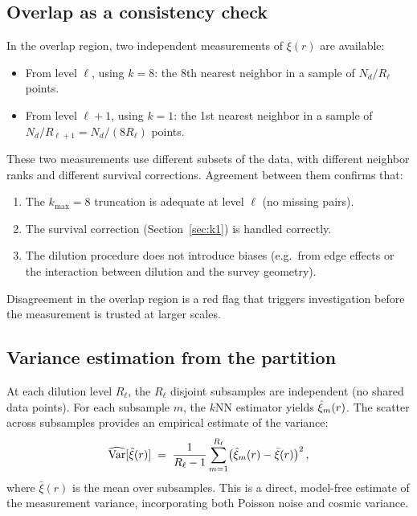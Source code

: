 \subsection{Overlap as a consistency check}
\label{sec:overlap}

In the overlap region, two independent measurements of $\xi(r)$ are available:
\begin{itemize}[nosep]
  \item From level $\ell$, using $k = 8$: the 8th nearest neighbor in a sample of $N_d / R_\ell$ points.
  \item From level $\ell + 1$, using $k = 1$: the 1st nearest neighbor in a sample of $N_d / R_{\ell+1} = N_d / (8 R_\ell)$ points.
\end{itemize}
These two measurements use different subsets of the data, with different neighbor ranks and different survival corrections.  Agreement between them confirms that:
\begin{enumerate}[nosep]
  \item The $k_{\max} = 8$ truncation is adequate at level $\ell$ (no missing pairs).
  \item The survival correction (Section~\ref{sec:k1}) is handled correctly.
  \item The dilution procedure does not introduce biases (e.g.\ from edge effects or the interaction between dilution and the survey geometry).
\end{enumerate}
Disagreement in the overlap region is a red flag that triggers investigation before the measurement is trusted at larger scales.

\subsection{Variance estimation from the partition}
\label{sec:variance}

At each dilution level $R_\ell$, the $R_\ell$ disjoint subsamples are independent (no shared data points).  For each subsample $m$, the $k$NN estimator yields $\hat{\xi}_m(r)$.  The scatter across subsamples provides an empirical estimate of the variance:
\begin{equation}
  \widehat{\mathrm{Var}}[\hat{\xi}(r)] \;=\; \frac{1}{R_\ell - 1}\sum_{m=1}^{R_\ell} \bigl(\hat{\xi}_m(r) - \bar{\xi}(r)\bigr)^2\,,
  \label{eq:var_estimate}
\end{equation}
where $\bar{\xi}(r)$ is the mean over subsamples.  This is a direct, model-free estimate of the measurement variance, incorporating both Poisson noise and cosmic variance.

